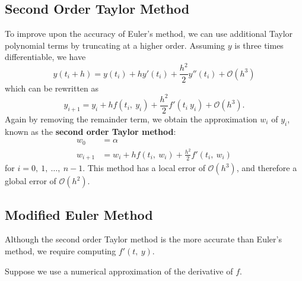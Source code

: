 \documentclass{article}
\begin{document}
\subsection{Second Order Taylor Method}
To improve upon the accuracy of Euler's method, we can use additional Taylor polynomial terms by truncating at a higher order.
Assuming \(y\) is three times differentiable, we have
\begin{equation*}
    y\left( t_i + h \right) = y\left( t_i \right) + h y'\left( t_i \right) + \frac{h^2}{2} y''\left( t_i \right) + \mathcal{O}\left( h^3 \right)
\end{equation*}
which can be rewritten as
\begin{equation*}
    y_{i + 1} = y_i + h f\left( t_i,\: y_i \right) + \frac{h^2}{2} f'\left( t_i\: y_i \right) + \mathcal{O}\left( h^3 \right).
\end{equation*}
Again by removing the remainder term, we obtain the approximation \(w_i\) of \(y_i\), known as the \textbf{second order Taylor method}:
\begin{align*}
    w_0       & = \alpha                                                                         \\
    w_{i + 1} & = w_i + h f\left( t_i,\: w_i \right) + \frac{h^2}{2} f'\left( t_i,\: w_i \right)
\end{align*}
for \(i = 0,\: 1,\: \ldots,\: n - 1\).
This method has a local error of \(\mathcal{O}\left( h^3 \right)\), and therefore a global error of \(\mathcal{O}\left( h^2 \right)\).
\subsection{Modified Euler Method}
Although the second order Taylor method is the more accurate than Euler's method,
we require computing \(f'\left( t,\: y \right)\).

Suppose we use a numerical approximation of the derivative of \(f\).
\end{document}
